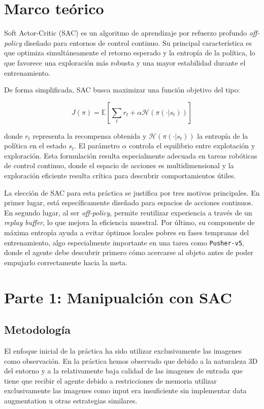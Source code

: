 \documentclass[10pt,twocolumn]{article}
\begin{document}
\section{Marco teórico}

Soft Actor-Critic (SAC) es un algoritmo de aprendizaje por refuerzo profundo \textit{off-policy} diseñado para entornos de control continuo. Su principal característica es que optimiza simultáneamente el retorno esperado y la entropía de la política, lo que favorece una exploración más robusta y una mayor estabilidad durante el entrenamiento.

De forma simplificada, SAC busca maximizar una función objetivo del tipo:

\[
J(\pi) = \mathbb{E}\left[\sum_t r_t + \alpha \mathcal{H}(\pi(\cdot|s_t))\right]
\]

donde \(r_t\) representa la recompensa obtenida y \(\mathcal{H}(\pi(\cdot|s_t))\) la entropía de la política en el estado \(s_t\). El parámetro \(\alpha\) controla el equilibrio entre explotación y exploración. Esta formulación resulta especialmente adecuada en tareas robóticas de control continuo, donde el espacio de acciones es multidimensional y la exploración eficiente resulta crítica para descubrir comportamientos útiles.

La elección de SAC para esta práctica se justifica por tres motivos principales. En primer lugar, está específicamente diseñado para espacios de acciones continuos. En segundo lugar, al ser \textit{off-policy}, permite reutilizar experiencia a través de un \textit{replay buffer}, lo que mejora la eficiencia muestral. Por último, su componente de máxima entropía ayuda a evitar óptimos locales pobres en fases tempranas del entrenamiento, algo especialmente importante en una tarea como \texttt{Pusher-v5}, donde el agente debe descubrir primero cómo acercarse al objeto antes de poder empujarlo correctamente hacia la meta.

\section{Parte 1: Manipualción con SAC}

\subsection{Metodología}
El enfoque inicial de la práctica ha sido utilizar exclusivamente las imagenes como observación. En la práctica hemos observado que debido a la naturaleza 3D del entorno y a la relativamente baja calidad de las imagenes de entrada que tiene que recibir el agente debido a restricciones de memoria utilizar exclusivamente las imagenes como input era insuficiente sin implementar data augmentation u otras estrategias similares.  
\end{document}
